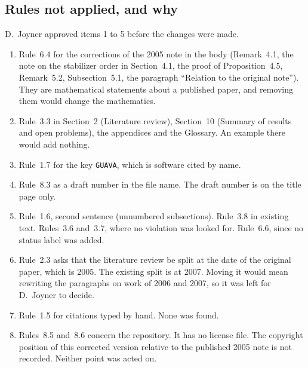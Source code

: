 \documentclass[12pt,letterpaper]{article}
\begin{document}
\subsection{Rules not applied, and why}
D.~Joyner approved items 1 to 5 before the changes were made.
\begin{enumerate}
\item Rule~6.4 for the corrections of the 2005 note in the body (Remark~4.1, the
note on the stabilizer order in Section~4.1, the proof of Proposition~4.5,
Remark~5.2, Subsection~5.1, the paragraph ``Relation to the original note'').
They are mathematical statements about a published paper, and removing them
would change the mathematics.
\item Rule~3.3 in Section~2 (Literature review), Section~10 (Summary of results
and open problems), the appendices and the Glossary. An example there would add
nothing.
\item Rule~1.7 for the key \texttt{GUAVA}, which is software cited by name.
\item Rule~8.3 as a draft number in the file name. The draft number is on the
title page only.
\item Rule~1.6, second sentence (unnumbered subsections). Rule~3.8 in existing
text. Rules~3.6 and~3.7, where no violation was looked for. Rule~6.6, since no
status label was added.
\item Rule~2.3 asks that the literature review be split at the date of the
original paper, which is 2005. The existing split is at 2007. Moving it would mean
rewriting the paragraphs on work of 2006 and 2007, so it was left for
D.~Joyner to decide.
\item Rule~1.5 for citations typed by hand. None was found.
\item Rules~8.5 and~8.6 concern the repository. It has no license file. The
copyright position of this corrected version relative to the published 2005 note
is not recorded. Neither point was acted on.
\end{enumerate}
\end{document}
